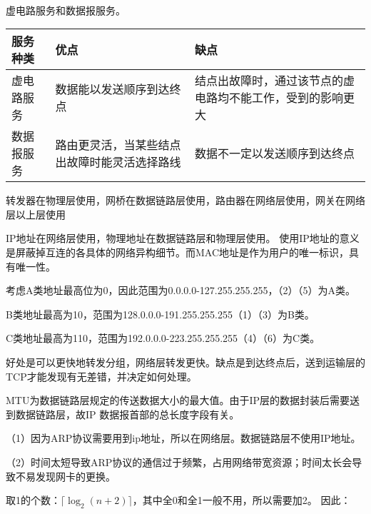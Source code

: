 \documentclass{ctexart}
\newcounter{answercnt}
\newcommand{\sCourse}{计算机网络}   %
\newcommand{\nTime}{4}             %
\newcommand{\sName}{黄昊}           %
\newcommand{\sNumber}{20204205}     %
\begin{document}
    \setcounter{answercnt}{0}
    \begin{center}
        \\
        \fontsize{13pt}{0}{\textit{\kaishu\sName\qquad\sNumber}}
    \end{center}
    
    \answer[4-01]
    虚电路服务和数据报服务。
    \begin{table}[htbp]
        \centering
        \begin{tabular}{m{4cm}m{6cm}m{6cm}}
            \hline
            服务种类&优点&缺点\\
            \hline
            虚电路服务&数据能以发送顺序到达终点&结点出故障时，通过该节点的虚电路均不能工作，受到的影响更大\\
            \hline
            数据报服务&路由更灵活，当某些结点出故障时能灵活选择路线&数据不一定以发送顺序到达终点 \\
            \hline
        \end{tabular}
    \end{table}

    \answer[4-03]
    转发器在物理层使用，网桥在数据链路层使用，路由器在网络层使用，网关在网络层以上层使用

    \answer[4-07]
    IP地址在网络层使用，物理地址在数据链路层和物理层使用。
    使用IP地址的意义是屏蔽掉互连的各具体的网络异构细节。而MAC地址是作为用户的唯一标识，具有唯一性。

    \answer[4-10]
    考虑A类地址最高位为0，因此范围为0.0.0.0-127.255.255.255，（2）（5）为A类。


    \quad B类地址最高为10，范围为128.0.0.0-191.255.255.255（1）（3）为B类。

    \quad C类地址最高为110，范围为192.0.0.0-223.255.255.255（4）（6）为C类。


    \answer[4-11]
    好处是可以更快地转发分组，网络层转发更快。缺点是到达终点后，送到运输层的TCP才能发现有无差错，并决定如何处理。

    \answer[4-15]
    MTU为数据链路层规定的传送数据大小的最大值。由于IP层的数据封装后需要送到数据链路层，故IP 数据报首部的总长度字段有关。

    \answer[4-18]
    （1）因为ARP协议需要用到ip地址，所以在网络层。数据链路层不使用IP地址。

    \quad（2）时间太短导致ARP协议的通信过于频繁，占用网络带宽资源；时间太长会导致不易发现网卡的更换。

    \answer[4-24]
    取1的个数：$\lceil\log_2(n+2) \rceil$，其中全0和全1一般不用，所以需要加2。
    因此：
\end{document}

